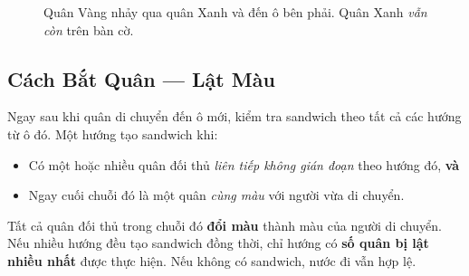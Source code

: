 \documentclass[12pt, a4paper]{article}
\begin{document}
\begin{figure}[H]
  \centering
  \caption{Quân Vàng nhảy qua quân Xanh và đến ô bên phải.
           Quân Xanh \emph{vẫn còn} trên bàn cờ.}
  \label{fig:movement}
\end{figure}

\subsection{Cách Bắt Quân --- Lật Màu}

Ngay sau khi quân di chuyển đến ô mới, kiểm tra sandwich theo tất cả
các hướng từ ô đó. Một hướng tạo sandwich khi:
\begin{itemize}
  \item Có một hoặc nhiều quân đối thủ \emph{liên tiếp không gián đoạn}
        theo hướng đó, \textbf{và}
  \item Ngay cuối chuỗi đó là một quân \emph{cùng màu} với người vừa
        di chuyển.
\end{itemize}
Tất cả quân đối thủ trong chuỗi đó \textbf{đổi màu} thành màu của người
di chuyển. Nếu nhiều hướng đều tạo sandwich đồng thời, chỉ hướng có
\textbf{số quân bị lật nhiều nhất} được thực hiện. Nếu không có sandwich,
nước đi vẫn hợp lệ.
\end{document}
